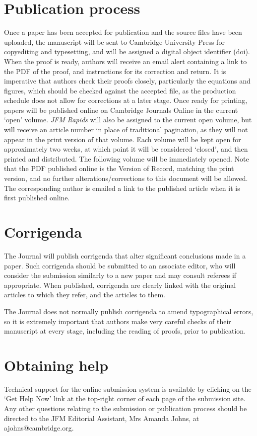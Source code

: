 \documentclass{jfm}
\begin{document}
\section{Publication process}
Once a paper has been accepted for publication and the source files have been uploaded, the manuscript will be sent to Cambridge University Press for copyediting and typesetting, and will be assigned a digital object identifier (doi). When the proof is ready, authors will receive an email alert containing a link to the PDF of the proof, and instructions for its correction and return. It is imperative that authors check their proofs closely, particularly the equations and figures, which should be checked against the accepted file, as the production schedule does not allow for corrections at a later stage. Once ready for printing, papers will be published online on Cambridge Journals Online in the current `open' volume. {\it JFM Rapids} will also be assigned to the current open volume, but will receive an article number in place of traditional pagination, as they will not appear in the print version of that volume. Each volume will be kept open for approximately two weeks, at which point it will be considered `closed', and then printed and distributed. The following volume will be immediately opened. Note that the PDF published online is the Version of Record, matching the print version, and no further alterations/corrections to this document will be allowed. The corresponding author is emailed a link to the published article when it is first published online.

\section{Corrigenda}
The Journal will publish corrigenda that alter significant conclusions made in a paper.  Such corrigenda should be submitted to an associate editor, who will consider the submission similarly to a new paper and may consult referees if appropriate.  When published, corrigenda are clearly linked with the original articles to which they refer, and the articles to them.

The Journal does not normally publish corrigenda to amend typographical errors, so it is extremely important that authors make very careful checks of their manuscript at every stage, including the reading of proofs, prior to publication.



\section{Obtaining help}
Technical support for the online submission system is available by clicking on the `Get Help Now' link at the top-right corner of each page of the submission site. Any other questions relating to the submission or publication process should be directed to the JFM Editorial Assistant, Mrs Amanda Johns, at ajohns@cambridge.org.
\end{document}
